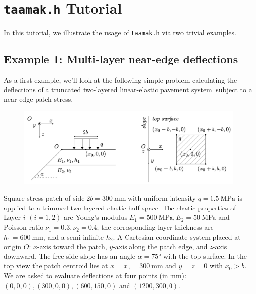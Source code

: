 \documentclass{article}
\newcommand{\tmk}{\texttt{taamak.h}}
\begin{document}
\section{\tmk{} Tutorial}
In this tutorial, we illustrate the usage of \tmk{} via two trivial examples.

\subsection{Example 1: Multi-layer near-edge deflections}
As a first example, we'll look at the following simple problem calculating the deflections of a truncated two-layered linear-elastic pavement system, subject to a near edge patch stress.
\begin{figure}[h]
    \centering
    \includegraphics[width=0.7\linewidth]{figures/ex1}
    \label{fig:ex1}
\end{figure}
\begin{question}
    Square stress patch of side \( 2b = \SI{300}{\milli\meter} \) with uniform intensity \( q = \SI{0.5}{\mega\pascal} \) is applied to a trimmed two-layered elastic half‑space. The elastic properties of Layer \( i \) \( (i=1,2) \) are Young's modulus \( E_1 = \SI{500}{\mega\pascal}, E_2 = \SI{50}{\mega\pascal} \) and Poisson ratio \( \nu_1 = 0.3, \nu_2 = 0.4 \); the corresponding layer thickness are \( h_1 = \SI{600}{\milli\meter} \), and a semi-infinite \( h_2 \). A Cartesian coordinate system placed at origin \( O \): \( x \)-axis toward the patch, \( y \)-axis along the patch edge, and \( z \)-axis downward. The free side slope has an angle \( \alpha = \ang{75} \) with the top surface. In the top view the patch centroid lies at \( x = x_0 = \SI{300}{\milli\meter}\) and \( y = z = 0 \) with \( x_0 > b \). We are asked to evaluate deflections at four points (in \si{\milli\meter}): \( (0,0,0), (300,0,0), (600,150,0) \text{ and } (1200,300,0) \). 
\end{question}
\end{document}
